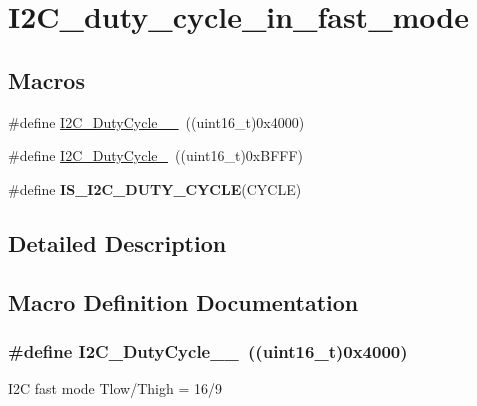 \hypertarget{group___i2_c__duty__cycle__in__fast__mode}{\section{I2\-C\-\_\-duty\-\_\-cycle\-\_\-in\-\_\-fast\-\_\-mode}
\label{group___i2_c__duty__cycle__in__fast__mode}
}
\subsection*{Macros}
\begin{DoxyCompactItemize}
\item 
\#define \hyperlink{group___i2_c__duty__cycle__in__fast__mode_ga2b4ff186808a8095fc2d1b8193f30ce1}{I2\-C\-\_\-\-Duty\-Cycle\-\_\-\_}~((uint16\-\_\-t)0x4000)
\item 
\#define \hyperlink{group___i2_c__duty__cycle__in__fast__mode_gafe0af31970aceef0fa8df6a10bef35db}{I2\-C\-\_\-\-Duty\-Cycle\-\_}~((uint16\-\_\-t)0x\-B\-F\-F\-F)
\item 
\#define {\bfseries I\-S\-\_\-\-I2\-C\-\_\-\-D\-U\-T\-Y\-\_\-\-C\-Y\-C\-L\-E}(C\-Y\-C\-L\-E)
\end{DoxyCompactItemize}


\subsection{Detailed Description}


\subsection{Macro Definition Documentation}
\hypertarget{group___i2_c__duty__cycle__in__fast__mode_ga2b4ff186808a8095fc2d1b8193f30ce1}{
\subsubsection[{I2\-C\-\_\-\-Duty\-Cycle\-\_\-16\-\_\-9}]{\setlength{\rightskip}{0pt plus 5cm}\#define I2\-C\-\_\-\-Duty\-Cycle\-\_\-\_~((uint16\-\_\-t)0x4000)}}\label{group___i2_c__duty__cycle__in__fast__mode_ga2b4ff186808a8095fc2d1b8193f30ce1}
I2\-C fast mode Tlow/\-Thigh = 16/9 

